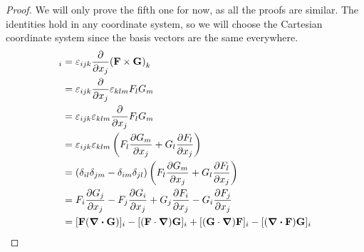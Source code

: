 \begin{proof}
	We will only prove the fifth one for now, as all the proofs are similar.
	The identities hold in any coordinate system, so we will choose the Cartesian coordinate system since the basis vectors are the same everywhere.
	\begin{align*}
		[\curl(\vb F \times \vb G)]_i & = \varepsilon_{ijk} \pdv{x_j} (\vb F \times \vb G)_k                                                            \\
		                              & = \varepsilon_{ijk} \pdv{x_j} \varepsilon_{klm} F_l G_m                                                         \\
		                              & = \varepsilon_{ijk} \varepsilon_{klm} \pdv{x_j} F_l G_m                                                         \\
		                              & = \varepsilon_{ijk} \varepsilon_{klm} \left( F_l \pdv{G_m}{x_j} + G_l \pdv{F_l}{x_j}  \right)                   \\
		                              & = (\delta_{il}\delta_{jm} - \delta_{im}\delta_{jl}) \left( F_l \pdv{G_m}{x_j} + G_l \pdv{F_l}{x_j} \right)      \\
		                              & = F_i \pdv{G_j}{x_j} - F_j \pdv{G_i}{x_j} + G_j \pdv{F_i}{x_j} - G_i \pdv{F_j}{x_j}                             \\
		                              & = [\vb F(\div{\vb G})]_i - [(\vb F \cdot \grad)\vb G]_i + [(\vb G \cdot \grad)\vb F]_i - [(\div{\vb F})\vb G]_i
	\end{align*}
\end{proof}

